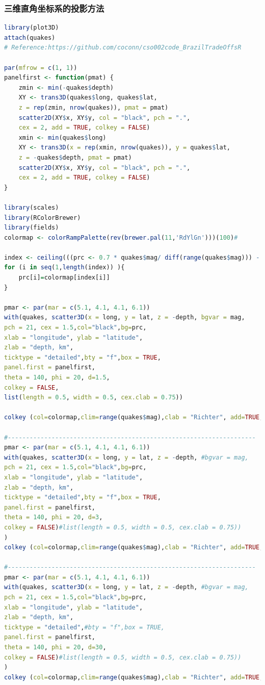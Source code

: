 \documentclass[11pt,a4paper,oneside]{book}
\begin{document}
\subsubsection{三维直角坐标系的投影方法}
\begin{lstlisting}[language=r]
library(plot3D)
attach(quakes)
# Reference:https://github.com/coconn/cso002code_BrazilTradeOffsR

par(mfrow = c(1, 1))
panelfirst <- function(pmat) {
	zmin <- min(-quakes$depth)
	XY <- trans3D(quakes$long, quakes$lat,
	z = rep(zmin, nrow(quakes)), pmat = pmat)
	scatter2D(XY$x, XY$y, col = "black", pch = ".",
	cex = 2, add = TRUE, colkey = FALSE)
	xmin <- min(quakes$long)
	XY <- trans3D(x = rep(xmin, nrow(quakes)), y = quakes$lat,
	z = -quakes$depth, pmat = pmat)
	scatter2D(XY$x, XY$y, col = "black", pch = ".",
	cex = 2, add = TRUE, colkey = FALSE)
}

library(scales)
library(RColorBrewer)
library(fields) 
colormap <- colorRampPalette(rev(brewer.pal(11,'RdYlGn')))(100)#

index <- ceiling(((prc <- 0.7 * quakes$mag/ diff(range(quakes$mag))) - min(prc) + 0.3)*100)
for (i in seq(1,length(index)) ){
	prc[i]=colormap[index[i]]
}

pmar <- par(mar = c(5.1, 4.1, 4.1, 6.1))
with(quakes, scatter3D(x = long, y = lat, z = -depth, bgvar = mag,
pch = 21, cex = 1.5,col="black",bg=prc,
xlab = "longitude", ylab = "latitude",
zlab = "depth, km", 
ticktype = "detailed",bty = "f",box = TRUE,
panel.first = panelfirst,
theta = 140, phi = 20, d=1.5,
colkey = FALSE,
list(length = 0.5, width = 0.5, cex.clab = 0.75))

colkey (col=colormap,clim=range(quakes$mag),clab = "Richter", add=TRUE, length=0.5,side = 4)

#--------------------------------------------------------------------
pmar <- par(mar = c(5.1, 4.1, 4.1, 6.1))
with(quakes, scatter3D(x = long, y = lat, z = -depth, #bgvar = mag,
pch = 21, cex = 1.5,col="black",bg=prc,
xlab = "longitude", ylab = "latitude",
zlab = "depth, km", 
ticktype = "detailed",bty = "f",box = TRUE,
panel.first = panelfirst,
theta = 140, phi = 20, d=3,
colkey = FALSE)#list(length = 0.5, width = 0.5, cex.clab = 0.75))
)
colkey (col=colormap,clim=range(quakes$mag),clab = "Richter", add=TRUE, length=0.5,side = 4)

#--------------------------------------------------------------------
pmar <- par(mar = c(5.1, 4.1, 4.1, 6.1))
with(quakes, scatter3D(x = long, y = lat, z = -depth, #bgvar = mag,
pch = 21, cex = 1.5,col="black",bg=prc,
xlab = "longitude", ylab = "latitude",
zlab = "depth, km", 
ticktype = "detailed",#bty = "f",box = TRUE,
panel.first = panelfirst,
theta = 140, phi = 20, d=30,
colkey = FALSE)#list(length = 0.5, width = 0.5, cex.clab = 0.75))
)
colkey (col=colormap,clim=range(quakes$mag),clab = "Richter", add=TRUE, length=0.5,side = 4)
\end{lstlisting}
\end{document}
